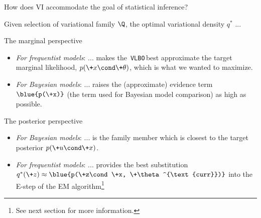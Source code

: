 \documentclass[10pt]{beamer}
\newcommand{\VLBO}{\,\texttt{VLBO}\,}
\begin{document}
\begin{frame}{How does VI accommodate the goal of statistical inference?}

Given selection of variational family $\Q$, the optimal variational density $q^*$ ...

\begin{block}{The marginal perspective}

\begin{itemize}


\item \textit{For frequentist models}: ... makes the \VLBO best approximate the  \alert{target marginal likelihood, $p(\+x \cond \+\theta)$}, which is what we wanted to maximize.
\item \textit{For Bayesian models}: ... raises the (approximate) evidence term $\blue{p(\+x)}$ (the term used for Bayesian model comparison) as high as possible. %
\end{itemize}

\end{block} 


\begin{block}{The posterior perspective}

\begin{itemize}
\item \textit{For Bayesian models}:  ...  is the family member which is closest to the\alert{ target  posterior $p(\+u \cond \+x)$}.
\item \textit{For frequentist models}: ... provides the best substitution $q^*(\+z) \approx \blue{p(\+z\cond \+x, \+\theta^{\text{curr}})}$ into the E-step of the EM algorithm\footnote{See next section for more information.}
\end{itemize}

\end{block} 
\end{frame}
\end{document}
